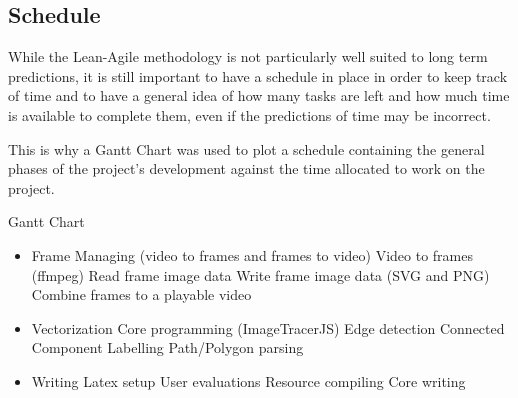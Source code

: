 \documentclass[12pt]{article}
\newcommand{\sentence}{} %
\begin{document}
    \subsection{Schedule}\label{subsec:schedule}


    \tab
    While the Lean-Agile methodology is not particularly well suited to long term predictions, it is still important
    to have a schedule in place in order to keep track of time and to have a general idea of how many tasks are left
    and how much time is available to complete them, even if the predictions of time may be incorrect.
    \sentence
    This is why a Gantt Chart was used to plot a schedule containing the general phases of the project's development
    against the time allocated to work on the project.
    \sentence
    \sentence


    \pagebreak
    \thispagestyle{empty}
    \begin{landscape}
        \begin{center}
            \huge{Gantt Chart}
            \normalsize
            \begin{itemize}
                \item Frame Managing (video to frames and frames to video)
                \subitem Video to frames (ffmpeg)
                \subitem Read frame image data
                \subitem Write frame image data (SVG and PNG)
                \subitem Combine frames to a playable video
                \item Vectorization
                \subitem Core programming (ImageTracerJS)
                \subitem Edge detection
                \subitem Connected Component Labelling
                \subitem Path/Polygon parsing
                \item Writing
                \subitem Latex setup
                \subitem User evaluations
                \subitem Resource compiling
                \subitem Core writing
            \end{itemize}
        \end{center}
    \end{landscape}
    \pagebreak

\end{document}
